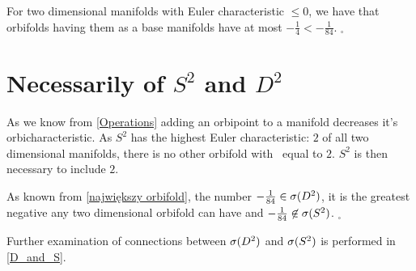 For 
two dimensional manifolds 
with Euler characteristic $\leq 0$, we have that orbifolds having them as a base manifolds 
have \Eoc at most $-\frac{1}{4} < -\frac{1}{84}$. 
$_\square$ 

\section{Necessarily of $S^2$ and $D^2$}\label{neccessity of d2 and s2}
As we know from \ref{Operations} adding an orbipoint to a manifold decreases it's 
orbicharacteristic. As $S^2$ has the highest Euler characteristic: $2$ of all 
two dimensional manifolds, there is no other orbifold with \Eoc\ equal to $2$. 
$S^2$ is then necessary to include $2$. 

As known from \ref{największy orbifold}, the number $-\frac{1}{84}\in{{\sigma}(D^2)}$, it is 
the greatest negative 
\Eoc any two dimensional orbifold can have and $-\frac{1}{84}\not\in{{\sigma}(S^2)}$. 
$_\square$  

Further examination of connections between ${{\sigma}(D^2)}$ and ${{\sigma}(S^2)}$ is performed in \ref{D_and_S}.






